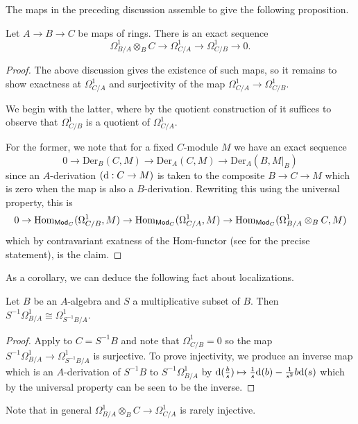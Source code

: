 The maps in the preceding discussion assemble to give the following proposition. 
\begin{proposition}\label{prop: tensor exact sequence}
    Let $A\to B\to C$ be maps of rings. There is an exact sequence 
    $$\Omega_{B/A}^{1}\otimes_{B}C\to \Omega_{C/A}^{1}\to\Omega_{C/B}^{1}\to0.$$
\end{proposition}
\begin{proof}
    The above discussion gives the existence of such maps, so it remains to show exactness at $\Omega^{1}_{C/A}$ and surjectivity of the map $\Omega^{1}_{C/A}\to\Omega^{1}_{C/B}$. 
    
    We begin with the latter, where by the quotient construction of  it suffices to observe that $\Omega^{1}_{C/B}$ is a quotient of $\Omega^{1}_{C/A}$. 

    For the former, we note that for a fixed $C$-module $M$ we have an exact sequence 
    $$0\to\mathrm{Der}_{B}(C,M)\to\mathrm{Der}_{A}(C,M)\to\mathrm{Der}_{A}(B,M|_{B})$$
    since an $A$-derivation $(\mathrm{d}:C\to M)$ is taken to the composite $B\to C\to M$ which is zero when the map is also a $B$-derivation. Rewriting this using the universal property, this is 
    $$0\to\mathrm{Hom}_{\mathsf{Mod}_{C}}(\Omega^{1}_{C/B},M)\to\mathrm{Hom}_{\mathsf{Mod}_{C}}(\Omega_{C/A}^{1},M)\to\mathrm{Hom}_{\mathsf{Mod}_{C}}(\Omega_{B/A}^{1}\otimes_{B}C,M)$$
    which by contravariant exatness of the Hom-functor (see \cite[\href{https://stacks.math.columbia.edu/tag/0582}{Tag 0582}]{stacks-project} for the precise statement), is the claim. 
\end{proof}
As a corollary, we can deduce the following fact about localizations. 
\begin{corollary}\label{corr: localization}
    Let $B$ be an $A$-algebra and $S$ a multiplicative subset of $B$. Then $S^{-1}\Omega_{B/A}^{1}\cong\Omega^{1}_{S^{-1}B/A}$. 
\end{corollary}
\begin{proof}
    Apply  to $C=S^{-1}B$ and note that $\Omega^{1}_{C/B}=0$ so the map $S^{-1}\Omega^{1}_{B/A}\to\Omega^{1}_{S^{-1}B/A}$ is surjective. To prove injectivity, we produce an inverse map which is an $A$-derivation of $S^{-1}B$ to $S^{-1}\Omega_{B/A}^{1}$ by $\mathrm{d}(\frac{b}{s})\mapsto \frac{1}{s}\mathrm{d}(b)-\frac{1}{s^{2}}b\mathrm{d}(s)$ which by the universal property can be seen to be the inverse. 
\end{proof}
Note that in general $\Omega^{1}_{B/A}\otimes_{B}C\to\Omega^{1}_{C/A}$ is rarely injective. 
